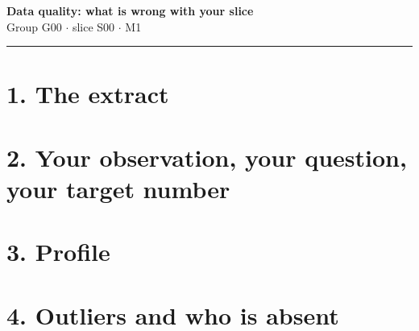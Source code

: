 \documentclass[10pt,a4paper]{article}
\begin{document}
\begingroup\centering
{{\Large\bfseries Data quality: what is wrong with your slice}}\\[0.3ex]
{{\small Group G00 $\cdot$ slice S00 $\cdot$ M1}}\\
\endgroup
\vspace{1ex}\hrule\vspace{1.2ex}


\section*{1. The extract}


\section*{2. Your observation, your question, your target number}


\section*{3. Profile}


\section*{4. Outliers and who is absent}
\end{document}
